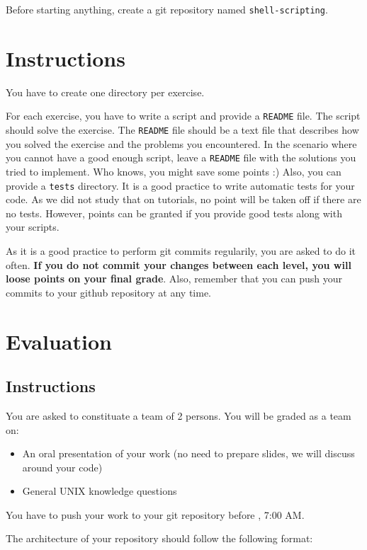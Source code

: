 \documentclass[12pt]{article}
\begin{document}
Before starting anything, create a git repository named \texttt{shell-scripting}.

\section{Instructions}

You have to create one directory per exercise.

For each exercise, you have to write a script and provide a \texttt{README} file. The script should solve the exercise. The \texttt{README} file should be a text file that describes how you solved the exercise and the problems you encountered. In the scenario where you cannot have a good enough script, leave a \texttt{README} file with the solutions you tried to implement. Who knows, you might save some points :) Also, you can provide a \texttt{tests} directory. It is a good practice to write automatic tests for your code. As we did not study that on tutorials, no point will be taken off if there are no tests. However, points can be granted if you provide good tests along with your scripts.

As it is a good practice to perform git commits regularily, you are asked to do it often. \textbf{If you do not commit your changes between each level, you will loose points on your final grade}. Also, remember that you can push your commits to your github repository at any time.

\section{Evaluation}
\subsection{Instructions}

You are asked to constituate a team of 2 persons. You will be graded as a team on:
\begin{itemize}
	\item An oral presentation of your work (no need to prepare slides, we will discuss around your code)
	\item General UNIX knowledge questions
\end{itemize}

You have to push your work to your git repository before , 7:00 AM.

The architecture of your repository should follow the following format:
\end{document}

